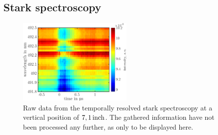\documentclass[a4paper,10pt,twoside]{article}
\begin{document}
			\begin{multicols}{2}
				
			\end{multicols}
			
			\twocolumn
		
		\subsection{Stark spectroscopy}
		
				\begin{figure}[h]
					\centering
					\includegraphics[width=0.5\textwidth]{figures/stark/stark_71inraw.pdf}
					\caption{Raw data from the temporally resolved stark spectroscopy at a vertical position of $\unit[7,1]{inch}$. The gathered information have not been processed any further, as only to be displayed here.}
				\end{figure}
\end{document}

